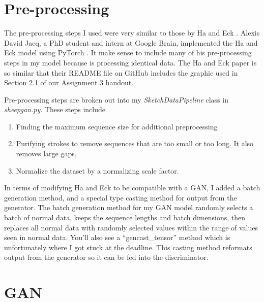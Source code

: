 \documentclass[a4paper,12pt]{article} %
\begin{document}
\section{Pre-processing}

The pre-processing steps I used were very similar to those by Ha and Eck
\cite{DBLP:journals/corr/HaE17}. Alexis David Jacq, a PhD student and
intern at Google Brain, implemented the Ha and Eck model
using PyTorch \cite{alexisja77:online}. It make sense to include many of his
pre-processing steps in my model because is processing identical data.
The Ha and Eck paper \cite{DBLP:journals/corr/HaE17} is so similar that their
README file on GitHub includes the graphic used in Section 2.1 of our
Assignment 3 handout.\newline

Pre-processing steps are broken out into my \textit{SketchDataPipeline}
class in \textit{sheepgan.py}. These steps include

\begin{enumerate}
\item Finding the maximum sequence size for additional preprocessing
\item Purifying strokes to remove sequences that are too small or too long.
  It also removes large gaps.
\item Normalize the dataset by a normalizing scale factor.
\end{enumerate}

In terms of modifying Ha and Eck \cite{DBLP:journals/corr/HaE17} to be
compatible with a GAN, I added a batch generation method, and a special
type casting method for output from the generator. The batch generation
method for my GAN model randomly selects a batch of normal data, keeps
the sequence lengths and batch dimensions, then replaces all normal data
with randomly selected values within the range of values seen in normal
data. You'll also see a ``gencast\_tensor'' method which is unfortunately
where I got stuck at the deadline. This casting method reformats output from
the generator so it can be fed into the discriminator.

\section{GAN}
\end{document}
